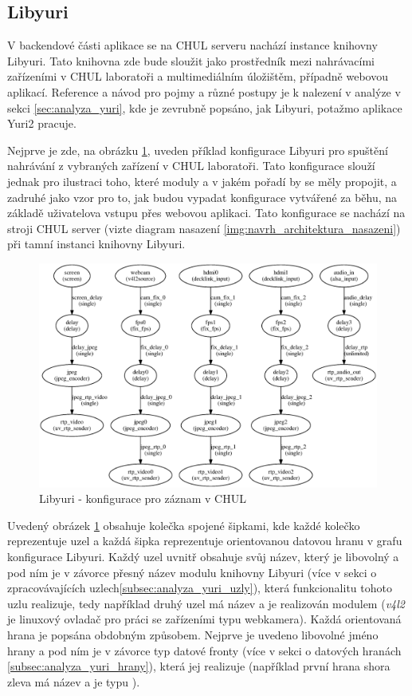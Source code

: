 \documentclass[thesis=M,czech]{FITthesis}[2012/06/26]
\begin{document}
\subsection{Libyuri} \label{subsec:navrh_backend_libyuri}
V backendové části aplikace se na CHUL serveru nachází instance knihovny Libyuri. Tato knihovna zde bude sloužit jako prostředník mezi nahrávacími zařízeními v CHUL laboratoři a multimediálním úložištěm, případně webovou aplikací. Reference a návod pro pojmy a různé postupy je k nalezení v analýze v sekci \ref{sec:analyza_yuri}, kde je zevrubně popsáno, jak Libyuri, potažmo aplikace Yuri2 pracuje.

Nejprve je zde, na obrázku \ref{img:navrh_backend_libyuri_sender}, uveden příklad konfigurace Libyuri pro spuštění nahrávání z vybraných zařízení v CHUL laboratoři. Tato konfigurace slouží jednak pro ilustraci toho, které moduly a v jakém pořadí by se měly propojit, a zadruhé jako vzor pro to, jak budou vypadat konfigurace vytvářené za běhu, na základě uživatelova vstupu přes webovou aplikaci. Tato konfigurace se nachází na stroji CHUL server (vizte diagram nasazení \ref{img:navrh_architektura_nasazeni}) při tamní instanci knihovny Libyuri.
\\
\begin{figure}[h]\centering
	\includegraphics[width=1\textwidth]{images/ulab_sender.eps}
	\caption{Libyuri - konfigurace pro záznam v CHUL}\label{img:navrh_backend_libyuri_sender}
\end{figure}

Uvedený obrázek \ref{img:navrh_backend_libyuri_sender} obsahuje kolečka spojené šipkami, kde každé kolečko reprezentuje uzel a každá šipka reprezentuje orientovanou datovou hranu v grafu konfigurace Libyuri. Každý uzel uvnitř obsahuje svůj název, který je libovolný a pod ním je v závorce přesný název modulu knihovny Libyuri (více v sekci o zpracovávajících uzlech\ref{subsec:analyza_yuri_uzly}), která funkcionalitu tohoto uzlu realizuje, tedy například druhý uzel má název  a je realizován modulem  (\textit{v4l2} je linuxový ovladač pro práci se zařízeními typu webkamera). Každá orientovaná hrana je popsána obdobným způsobem. Nejprve je uvedeno libovolné jméno hrany a pod ním je v závorce typ datové fronty (více v sekci o datových hranách \ref{subsec:analyza_yuri_hrany}), která jej realizuje (například první hrana shora zleva má název  a je typu ).
\end{document}
